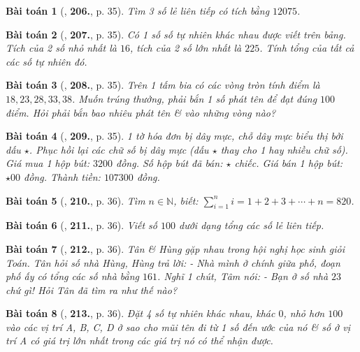 \documentclass{article}
\numberwithin{equation}{section}
\newtheorem{baitoan}{Bài toán}[section]
\begin{document}
\begin{baitoan}[\cite{Binh_Toan_6_tap_1}, \textbf{206.}, p. 35]
	Tìm 3 số lẻ liên tiếp có tích bằng $12075$.
\end{baitoan}

\begin{baitoan}[\cite{Binh_Toan_6_tap_1}, \textbf{207.}, p. 35]
	Có 1 số số tự nhiên khác nhau được viết trên bảng. Tích của 2 số nhỏ nhất là $16$, tích của 2 số lớn nhất là $225$. Tính tổng của tất cả các số tự nhiên đó.
\end{baitoan}

\begin{baitoan}[\cite{Binh_Toan_6_tap_1}, \textbf{208.}, p. 35]
	Trên 1 tấm bia có các vòng tròn tính điểm là $18,23,28,33,38$. Muốn trúng thưởng, phải bắn 1 số phát tên để đạt đúng $100$ điểm. Hỏi phải bắn bao nhiêu phát tên \& vào những vòng nào?
\end{baitoan}

\begin{baitoan}[\cite{Binh_Toan_6_tap_1}, \textbf{209.}, p. 35]
	1 tờ hóa đơn bị dây mực, chỗ dây mực biểu thị bởi dấu $\star$. Phục hồi lại các chữ số bị dây mực (dấu $\star$ thay cho 1 hay nhiều chữ số). Giá mua 1 hộp bút: $3200$ đồng. Số hộp bút đã bán: $\star$ chiếc. Giá bán 1 hộp bút: $\star00$ đồng. Thành tiền: $107300$ đồng.
\end{baitoan}

\begin{baitoan}[\cite{Binh_Toan_6_tap_1}, \textbf{210.}, p. 36]
	Tìm $n\in\mathbb{N}$, biết: $\sum_{i=1}^n i = 1 + 2 + 3 + \cdots + n = 820$.
\end{baitoan}

\begin{baitoan}[\cite{Binh_Toan_6_tap_1}, \textbf{211.}, p. 36]
	Viết số $100$ dưới dạng tổng các số lẻ liên tiếp.
\end{baitoan}

\begin{baitoan}[\cite{Binh_Toan_6_tap_1}, \textbf{212.}, p. 36]
	Tân \& Hùng gặp nhau trong hội nghị học sinh giỏi Toán. Tân hỏi số nhà Hùng, Hùng trả lời: - Nhà mình ở chính giữa phố, đoạn phố ấy có tổng các số nhà bằng $161$. Nghĩ 1 chút, Tâm nói: - Bạn ở số nhà $23$ chứ gì! Hỏi Tân đã tìm ra như thế nào?
\end{baitoan}

\begin{baitoan}[\cite{Binh_Toan_6_tap_1}, \textbf{213.}, p. 36]
	Đặt 4 số tự nhiên khác nhau, khác $0$, nhỏ hơn $100$ vào các vị trí A, B, C, D ở \cite[Hình 6, p. 36]{Binh_Toan_6_tap_1} sao cho mũi tên đi từ 1 số đến ước của nó \& số ở vị trí A có giá trị lớn nhất trong các giá trị nó có thể nhận được.
\end{baitoan}
\end{document}
